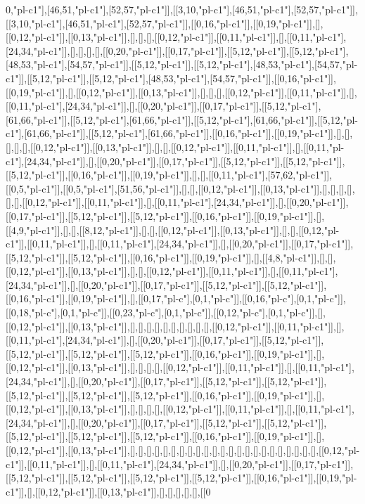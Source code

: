 0,"pl-c1"],[46,51,"pl-c1"],[52,57,"pl-c1"]],[[3,10,"pl-c1"],[46,51,"pl-c1"],[52,57,"pl-c1"]],[[3,10,"pl-c1"],[46,51,"pl-c1"],[52,57,"pl-c1"]],[[0,16,"pl-c1"]],[[0,19,"pl-c1"]],[],[[0,12,"pl-c1"]],[[0,13,"pl-c1"]],[],[],[],[[0,12,"pl-c1"]],[[0,11,"pl-c1"]],[],[[0,11,"pl-c1"],[24,34,"pl-c1"]],[],[],[],[],[[0,20,"pl-c1"]],[[0,17,"pl-c1"]],[[5,12,"pl-c1"]],[[5,12,"pl-c1"],[48,53,"pl-c1"],[54,57,"pl-c1"]],[[5,12,"pl-c1"]],[[5,12,"pl-c1"],[48,53,"pl-c1"],[54,57,"pl-c1"]],[[5,12,"pl-c1"]],[[5,12,"pl-c1"],[48,53,"pl-c1"],[54,57,"pl-c1"]],[[0,16,"pl-c1"]],[[0,19,"pl-c1"]],[],[[0,12,"pl-c1"]],[[0,13,"pl-c1"]],[],[],[],[[0,12,"pl-c1"]],[[0,11,"pl-c1"]],[],[[0,11,"pl-c1"],[24,34,"pl-c1"]],[],[[0,20,"pl-c1"]],[[0,17,"pl-c1"]],[[5,12,"pl-c1"],[61,66,"pl-c1"]],[[5,12,"pl-c1"],[61,66,"pl-c1"]],[[5,12,"pl-c1"],[61,66,"pl-c1"]],[[5,12,"pl-c1"],[61,66,"pl-c1"]],[[5,12,"pl-c1"],[61,66,"pl-c1"]],[[0,16,"pl-c1"]],[[0,19,"pl-c1"]],[],[],[],[],[],[[0,12,"pl-c1"]],[[0,13,"pl-c1"]],[],[],[[0,12,"pl-c1"]],[[0,11,"pl-c1"]],[],[[0,11,"pl-c1"],[24,34,"pl-c1"]],[],[[0,20,"pl-c1"]],[[0,17,"pl-c1"]],[[5,12,"pl-c1"]],[[5,12,"pl-c1"]],[[5,12,"pl-c1"]],[[0,16,"pl-c1"]],[[0,19,"pl-c1"]],[],[],[[0,11,"pl-c1"],[57,62,"pl-c1"]],[[0,5,"pl-c1"]],[[0,5,"pl-c1"],[51,56,"pl-c1"]],[],[],[[0,12,"pl-c1"]],[[0,13,"pl-c1"]],[],[],[],[],[],[],[[0,12,"pl-c1"]],[[0,11,"pl-c1"]],[],[[0,11,"pl-c1"],[24,34,"pl-c1"]],[],[[0,20,"pl-c1"]],[[0,17,"pl-c1"]],[[5,12,"pl-c1"]],[[5,12,"pl-c1"]],[[0,16,"pl-c1"]],[[0,19,"pl-c1"]],[],[[4,9,"pl-c1"]],[],[],[[8,12,"pl-c1"]],[],[],[[0,12,"pl-c1"]],[[0,13,"pl-c1"]],[],[],[[0,12,"pl-c1"]],[[0,11,"pl-c1"]],[],[[0,11,"pl-c1"],[24,34,"pl-c1"]],[],[[0,20,"pl-c1"]],[[0,17,"pl-c1"]],[[5,12,"pl-c1"]],[[5,12,"pl-c1"]],[[0,16,"pl-c1"]],[[0,19,"pl-c1"]],[],[[4,8,"pl-c1"]],[],[],[[0,12,"pl-c1"]],[[0,13,"pl-c1"]],[],[],[[0,12,"pl-c1"]],[[0,11,"pl-c1"]],[],[[0,11,"pl-c1"],[24,34,"pl-c1"]],[],[[0,20,"pl-c1"]],[[0,17,"pl-c1"]],[[5,12,"pl-c1"]],[[5,12,"pl-c1"]],[[0,16,"pl-c1"]],[[0,19,"pl-c1"]],[],[[0,17,"pl-c"],[0,1,"pl-c"]],[[0,16,"pl-c"],[0,1,"pl-c"]],[[0,18,"pl-c"],[0,1,"pl-c"]],[[0,23,"pl-c"],[0,1,"pl-c"]],[[0,12,"pl-c"],[0,1,"pl-c"]],[],[[0,12,"pl-c1"]],[[0,13,"pl-c1"]],[],[],[],[],[],[],[],[],[],[],[[0,12,"pl-c1"]],[[0,11,"pl-c1"]],[],[[0,11,"pl-c1"],[24,34,"pl-c1"]],[],[[0,20,"pl-c1"]],[[0,17,"pl-c1"]],[[5,12,"pl-c1"]],[[5,12,"pl-c1"]],[[5,12,"pl-c1"]],[[5,12,"pl-c1"]],[[0,16,"pl-c1"]],[[0,19,"pl-c1"]],[],[[0,12,"pl-c1"]],[[0,13,"pl-c1"]],[],[],[],[],[[0,12,"pl-c1"]],[[0,11,"pl-c1"]],[],[[0,11,"pl-c1"],[24,34,"pl-c1"]],[],[[0,20,"pl-c1"]],[[0,17,"pl-c1"]],[[5,12,"pl-c1"]],[[5,12,"pl-c1"]],[[5,12,"pl-c1"]],[[5,12,"pl-c1"]],[[5,12,"pl-c1"]],[[0,16,"pl-c1"]],[[0,19,"pl-c1"]],[],[[0,12,"pl-c1"]],[[0,13,"pl-c1"]],[],[],[],[],[[0,12,"pl-c1"]],[[0,11,"pl-c1"]],[],[[0,11,"pl-c1"],[24,34,"pl-c1"]],[],[[0,20,"pl-c1"]],[[0,17,"pl-c1"]],[[5,12,"pl-c1"]],[[5,12,"pl-c1"]],[[5,12,"pl-c1"]],[[5,12,"pl-c1"]],[[5,12,"pl-c1"]],[[0,16,"pl-c1"]],[[0,19,"pl-c1"]],[],[[0,12,"pl-c1"]],[[0,13,"pl-c1"]],[],[],[],[],[],[],[],[],[],[],[],[],[],[],[],[],[],[],[],[],[],[],[],[[0,12,"pl-c1"]],[[0,11,"pl-c1"]],[],[[0,11,"pl-c1"],[24,34,"pl-c1"]],[],[[0,20,"pl-c1"]],[[0,17,"pl-c1"]],[[5,12,"pl-c1"]],[[5,12,"pl-c1"]],[[5,12,"pl-c1"]],[[5,12,"pl-c1"]],[[0,16,"pl-c1"]],[[0,19,"pl-c1"]],[],[[0,12,"pl-c1"]],[[0,13,"pl-c1"]],[],[],[],[],[],[[0